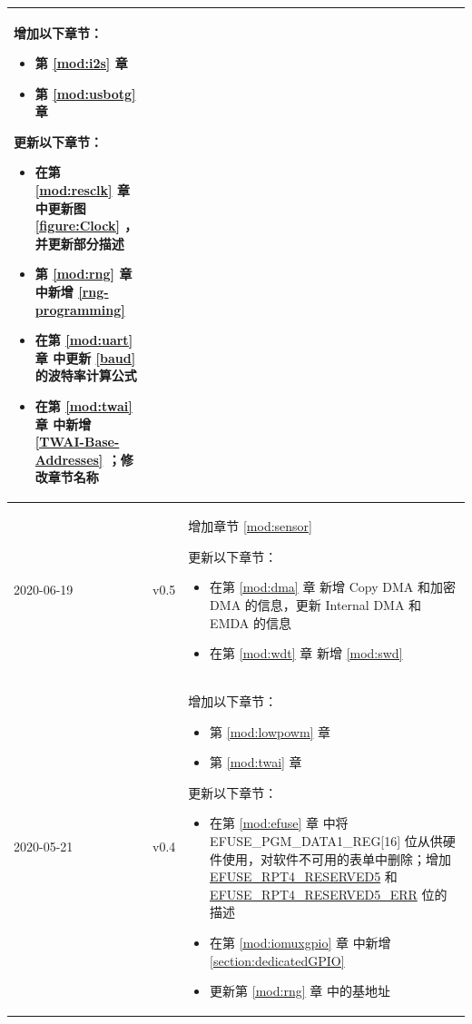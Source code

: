 \begin{longtable}[l]{ | m{2cm} | m{1.5cm} | m{12cm} | }
    增加以下章节：
    \begin{itemize}
        \item 第 \ref{mod:i2s} 章 \textit{\nameref{mod:i2s}}
        \item 第 \ref{mod:usbotg} 章 \textit{\nameref{mod:usbotg}}
    \end{itemize}

    更新以下章节：
    \begin{itemize}
        \item 在第 \ref{mod:resclk} 章 \textit{\nameref{mod:resclk}} 中更新图 \ref{figure:Clock}
    \textit{\nameref{figure:Clock}}，并更新部分描述
        \item 第 \ref{mod:rng} 章 \textit{\nameref{mod:rng}} 中新增 \ref{rng-programming}
        \item 在第 \ref{mod:uart} 章 \textit{\nameref{mod:uart}} 中更新 \ref{baud} \textit{\nameref{baud}} 的波特率计算公式
        \item 在第 \ref{mod:twai} 章 \textit{\nameref{mod:twai}} 中新增 \ref{TWAI-Base-Addresses} \textit{\nameref{TWAI-Base-Addresses}}；修改章节名称
    \vspace{-1em}
    \end{itemize}
    \\\hline
    2020-06-19 & v0.5 &
    增加章节 \ref{mod:sensor} \textit{\nameref{mod:sensor}}

    更新以下章节：
    \begin{itemize}
        \item 在第 \ref{mod:dma} 章 \textit{\nameref{mod:dma}} 新增 Copy DMA 和加密 DMA 的信息，更新 Internal DMA 和 EMDA 的信息
        \item 在第 \ref{mod:wdt} 章 \textit{\nameref{mod:wdt}} 新增 \ref{mod:swd} \textit{\nameref{mod:swd}}
    \vspace{-1em}
    \end{itemize}
    \\\hline
    2020-05-21 & v0.4 &
    增加以下章节：
    \begin{itemize}
    \item 第 \ref{mod:lowpowm} 章 \textit{\nameref{mod:lowpowm}}
    \item 第 \ref{mod:twai} 章
    \textit{\nameref{mod:twai}}
    \end{itemize}
    更新以下章节：
    \begin{itemize}
        \item  在第 \ref{mod:efuse} 章 \textit{\nameref{mod:efuse}}中将 EFUSE\_PGM\_DATA1\_REG[16] 位从供硬件使用，对软件不可用的表单中删除；增加 \hyperref[fielddesc:EFUSERPT4RESERVED5]{EFUSE\_RPT4\_RESERVED5} 和 \hyperref[fielddesc:EFUSERPT4RESERVED5ERR]{EFUSE\_RPT4\_RESERVED5\_ERR} 位的描述
        \item 在第 \ref{mod:iomuxgpio} 章 \textit{\nameref{mod:iomuxgpio}} 中新增 \ref{section:dedicatedGPIO} \textit{\nameref{section:dedicatedGPIO}}
        \item 更新第 \ref{mod:rng} 章 \textit{\nameref{mod:rng}} 中的基地址
    \vspace{-1em}
    \end{itemize}
    \\\hline


\end{longtable}
